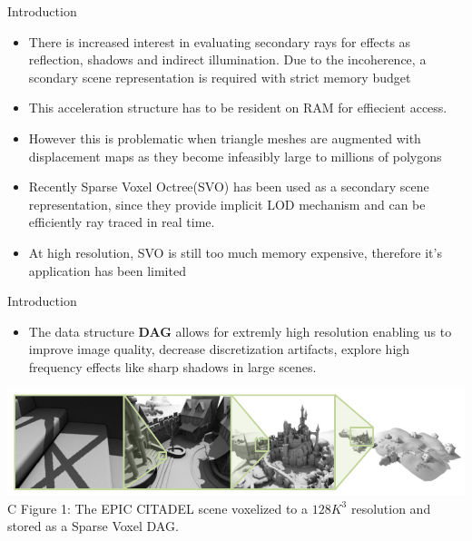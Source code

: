 \documentclass{beamer}
\begin{document}
\begin{frame}{Introduction}
  \begin{itemize}
  \item {
    There is increased interest in evaluating secondary rays for effects as reflection, shadows and indirect illumination. Due to the incoherence, a scondary scene representation is required with strict memory budget
    
  }
  \item {   
    This acceleration structure has to be resident on RAM for effiecient access.
  }
  \item{
  However this is problematic when triangle meshes are augmented with displacement maps as they become infeasibly large to millions of polygons
  \pause
  }
  \item {
  	Recently Sparse Voxel Octree(SVO) has been used as a secondary scene representation, since they provide implicit LOD mechanism and can be efficiently ray traced in real time.
  }
  \item {
  	At high resolution, SVO is still too much memory expensive, therefore it's application has been limited }
  \end{itemize}
\end{frame}

\begin{frame}{Introduction}
  \begin{itemize}
  \item {
  		The data structure \textbf{DAG} allows for extremly high resolution enabling us to improve image quality, decrease discretization artifacts, explore high frequency effects like sharp shadows in large scenes.
    }
 
  \end{itemize}
  \includegraphics[scale=0.36]{fig1}{C Figure 1: The EPIC CITADEL scene voxelized to a $128K^3$ resolution and stored as a Sparse Voxel DAG.}
\end{frame}
\end{document}

